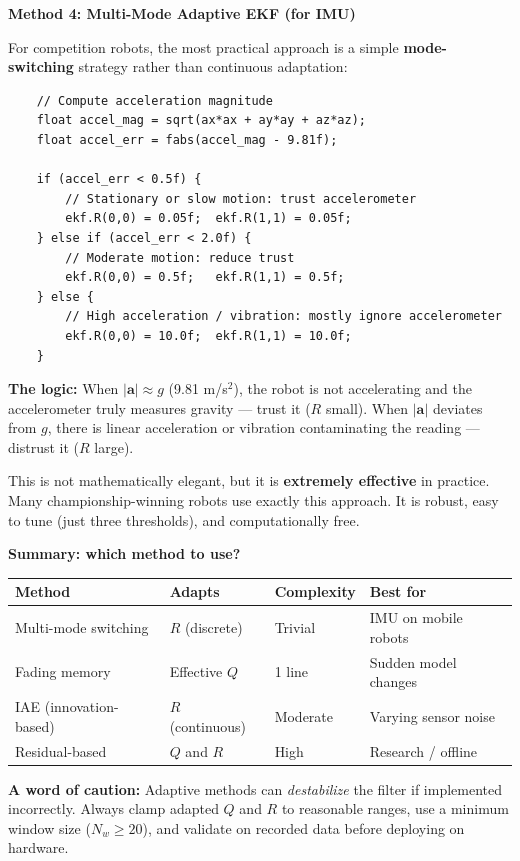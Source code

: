 \textbf{Method 4: Multi-Mode Adaptive EKF (for IMU)}

For competition robots, the most practical approach is a simple \textbf{mode-switching} strategy rather than continuous adaptation:

\begin{verbatim}
    // Compute acceleration magnitude
    float accel_mag = sqrt(ax*ax + ay*ay + az*az);
    float accel_err = fabs(accel_mag - 9.81f);

    if (accel_err < 0.5f) {
        // Stationary or slow motion: trust accelerometer
        ekf.R(0,0) = 0.05f;  ekf.R(1,1) = 0.05f;
    } else if (accel_err < 2.0f) {
        // Moderate motion: reduce trust
        ekf.R(0,0) = 0.5f;   ekf.R(1,1) = 0.5f;
    } else {
        // High acceleration / vibration: mostly ignore accelerometer
        ekf.R(0,0) = 10.0f;  ekf.R(1,1) = 10.0f;
    }
\end{verbatim}

\textbf{The logic:} When $|\mathbf{a}| \approx g$ (9.81 m/s$^2$), the robot is not accelerating and the accelerometer truly measures gravity --- trust it ($R$ small). When $|\mathbf{a}|$ deviates from $g$, there is linear acceleration or vibration contaminating the reading --- distrust it ($R$ large).

This is not mathematically elegant, but it is \textbf{extremely effective} in practice. Many championship-winning robots use exactly this approach. It is robust, easy to tune (just three thresholds), and computationally free.

\textbf{Summary: which method to use?}

\begin{center}
\begin{tabular}{llll}
\toprule
\textbf{Method} & \textbf{Adapts} & \textbf{Complexity} & \textbf{Best for} \\
\midrule
Multi-mode switching & $R$ (discrete) & Trivial & IMU on mobile robots \\
Fading memory & Effective $Q$ & 1 line & Sudden model changes \\
IAE (innovation-based) & $R$ (continuous) & Moderate & Varying sensor noise \\
Residual-based & $Q$ and $R$ & High & Research / offline \\
\bottomrule
\end{tabular}
\end{center}

\textbf{A word of caution:} Adaptive methods can \textit{destabilize} the filter if implemented incorrectly. Always clamp adapted $Q$ and $R$ to reasonable ranges, use a minimum window size ($N_w \geq 20$), and validate on recorded data before deploying on hardware.

